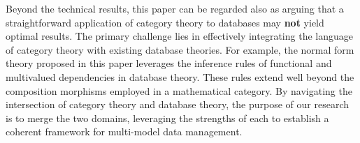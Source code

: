 Beyond the technical results, this paper can be regarded
also as arguing that a straightforward application of category theory to databases may \textbf{not} yield optimal results. The primary challenge lies in effectively integrating the language of category theory with existing database theories. For example, the normal form theory proposed in this paper leverages the inference rules of functional and multivalued dependencies in database theory. These rules extend well beyond the composition morphisms employed in a mathematical category.  By navigating the intersection of category theory and database theory, the purpose of our research is to merge the two domains, leveraging the strengths of each to establish a coherent framework for multi-model data management.


\smallskip
  

 
 
 
 
 


